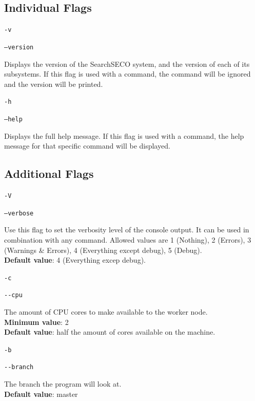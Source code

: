 \documentclass{article}
\begin{document}
\subsection{Individual Flags}
\texttt{-v}\par
\texttt{--version}\par
\begin{adjustwidth}{1cm}{}
Displays the version of the SearchSECO system, and the version of each of its subsystems. If this flag is used with a command, the command will be ignored and the version will be printed.
\end{adjustwidth}

\texttt{-h}\par
\texttt{--help}\par
\begin{adjustwidth}{1cm}{}
Displays the full help message. If this flag is used with a command, the help message for that specific command will be displayed.
\end{adjustwidth}

\subsection{Additional Flags}
\texttt{-V}\par
\texttt{--verbose}\par
\begin{adjustwidth}{1cm}{}
Use this flag to set the verbosity level of the console output. It can be used in combination with any command. Allowed values are 1 (Nothing), 2 (Errors), 3 (Warnings \& Errors), 4 (Everything except debug), 5 (Debug).\\
\textbf{Default value}: 4 (Everything excep debug). 
\end{adjustwidth}

\texttt{-c}\par
\texttt{-{}-cpu}\par
\begin{adjustwidth}{1cm}{}
The amount of CPU cores to make available to the worker node. \\
\textbf{Minimum value}: 2 \\
\textbf{Default value}: half the amount of cores available on the machine. 
\end{adjustwidth}

\texttt{-b}\par
\texttt{-{}-branch}\par
\begin{adjustwidth}{1cm}{}
The branch the program will look at. \\
\textbf{Default value}: master 
\end{adjustwidth}
\end{document}
